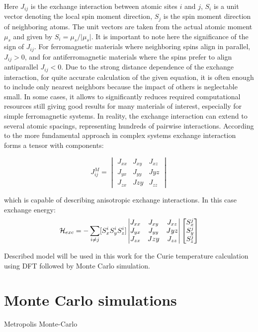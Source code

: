 Here $J_{ij}$ is the exchange interaction between atomic sites $i$ and $j$, $S_i$ is a unit vector denoting the local spin moment direction, $S_j$ is the spin moment direction of neighboring atoms. The unit vectors are taken from the actual atomic moment $\mu_s$ and given by $S_i=\mu_s/\vert\mu_s\vert$.
It is important to note here the significance of the sign of $J_{ij}$. For ferromagnetic materials where neighboring spins align in parallel, $J_{ij} > 0$, and for antiferromagnetic materials where the spins prefer to align antiparallel $J_{ij} < 0$.
Due to the strong distance dependence of the exchange interaction, for quite accurate calculation of the given equation, it is often enough to include only nearest neighbors because the impact of others is neglectable small. In some cases, it allows to significantly reduces required computational resources still giving good results for many materials of interest, especially for simple ferromagnetic systems. In reality, the exchange interaction can extend to several atomic spacings, representing hundreds of pairwise interactions.
According to the more fundamental approach in complex systems exchange interaction forms a tensor with components:

\begin{equation}J_{ij}^M=
\begin{vmatrix}J_{xx} & J_{xy} & J_{xz}\\J_{yx} & J_{yy} & J{yz}\\J_{zx} & J{zy} & J_{zz}\end{vmatrix}
\end{equation}

which is capable of describing anisotropic exchange interactions. In this case exchange energy:
\begin{equation}
{\cal H}_{exc}=-\sum_{i\neq j} [S_x^i S_y^i S_z^i]
\begin{vmatrix}
J_{xx} &J_{xy} & J_{xz}\\
J_{yx} & J_{yy} & J{yz}\\
J_{zx} & J{zy} & J_{zz}
\end{vmatrix}
\begin{bmatrix}
S_{x}^j\\
S_{y}^j\\
S_{z}^j
\end{bmatrix}
\end{equation}

Described model will be used in this work for the Curie temperature calculation using DFT followed by Monte Carlo simulation.

\section{Monte Carlo simulations}

Metropolis Monte-Carlo